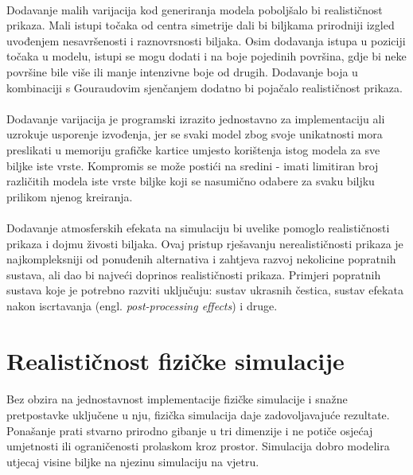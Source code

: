 \documentclass[times, utf8, diplomski]{fer}
\begin{document}
\paragraph{}
Dodavanje malih varijacija kod generiranja modela poboljšalo bi realističnost 
prikaza. Mali istupi točaka od centra simetrije dali bi biljkama prirodniji
izgled uvođenjem nesavršenosti i raznovrsnosti biljaka. Osim dodavanja istupa
u poziciji točaka u modelu, istupi se mogu dodati i na boje pojedinih površina,
gdje bi neke površine bile više ili manje intenzivne boje od drugih. Dodavanje
boja u kombinaciji s Gouraudovim sjenčanjem dodatno bi pojačalo realističnost
prikaza.
\paragraph{}
Dodavanje varijacija je programski izrazito jednostavno za implementaciju ali
uzrokuje usporenje izvođenja, jer se svaki model zbog svoje unikatnosti mora
preslikati u memoriju grafičke kartice umjesto korištenja istog modela za sve 
biljke iste vrste. Kompromis se može postići na sredini - imati limitiran broj 
različitih modela iste vrste biljke koji se nasumično odabere za svaku biljku 
prilikom njenog kreiranja.
\paragraph{}
Dodavanje atmosferskih efekata na simulaciju bi uvelike pomoglo realističnosti
prikaza i dojmu živosti biljaka. Ovaj pristup rješavanju nerealističnosti 
prikaza je najkompleksniji od ponuđenih alternativa i zahtjeva razvoj nekolicine 
popratnih sustava, ali dao bi najveći doprinos realističnosti prikaza. Primjeri 
popratnih sustava koje je potrebno razviti uključuju: sustav ukrasnih čestica, 
sustav efekata nakon iscrtavanja (engl. \textit{post-processing effects}) i 
druge. 

\section{Realističnost fizičke simulacije} \label{physics_model_eval}
\paragraph{}
Bez obzira na jednostavnost implementacije fizičke simulacije i snažne
pretpostavke uključene u nju, fizička simulacija daje zadovoljavajuće rezultate.
Ponašanje prati stvarno prirodno gibanje u tri dimenzije i ne potiče osjećaj 
umjetnosti ili ograničenosti prolaskom kroz prostor. Simulacija dobro modelira
utjecaj visine biljke na njezinu simulaciju na vjetru. 
\end{document}
